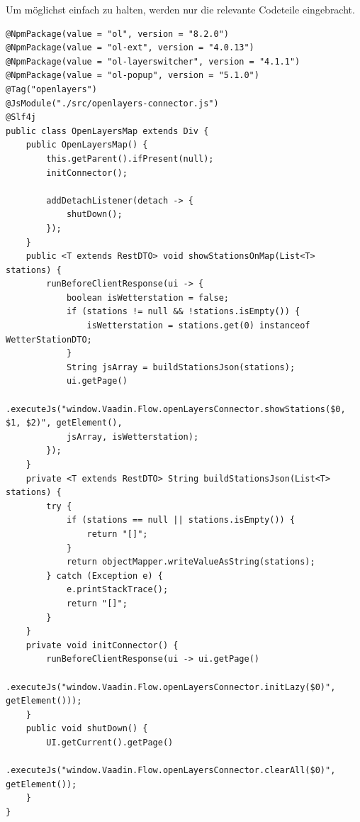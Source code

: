 \documentclass[a4paper,12pt]{scrreprt}
\begin{document}
Um möglichst einfach zu halten, werden nur die relevante Codeteile eingebracht.
\begin{lstlisting}
@NpmPackage(value = "ol", version = "8.2.0")
@NpmPackage(value = "ol-ext", version = "4.0.13")
@NpmPackage(value = "ol-layerswitcher", version = "4.1.1")
@NpmPackage(value = "ol-popup", version = "5.1.0")
@Tag("openlayers")
@JsModule("./src/openlayers-connector.js")
@Slf4j
public class OpenLayersMap extends Div {
	public OpenLayersMap() {
		this.getParent().ifPresent(null);
		initConnector();
		
		addDetachListener(detach -> {
			shutDown();
		});
	}
	public <T extends RestDTO> void showStationsOnMap(List<T> stations) {
		runBeforeClientResponse(ui -> {
			boolean isWetterstation = false;
			if (stations != null && !stations.isEmpty()) {
				isWetterstation = stations.get(0) instanceof WetterStationDTO;
			}
			String jsArray = buildStationsJson(stations);
			ui.getPage()
			.executeJs("window.Vaadin.Flow.openLayersConnector.showStations($0, $1, $2)", getElement(),
			jsArray, isWetterstation);
		});
	}
	private <T extends RestDTO> String buildStationsJson(List<T> stations) {
		try {
			if (stations == null || stations.isEmpty()) {
				return "[]";
			}
			return objectMapper.writeValueAsString(stations);
		} catch (Exception e) {
			e.printStackTrace();
			return "[]";
		}
	}
	private void initConnector() {
		runBeforeClientResponse(ui -> ui.getPage()
		.executeJs("window.Vaadin.Flow.openLayersConnector.initLazy($0)", getElement()));
	}
	public void shutDown() {
		UI.getCurrent().getPage()
		.executeJs("window.Vaadin.Flow.openLayersConnector.clearAll($0)", getElement());
	}
}
\end{lstlisting}
\end{document}
